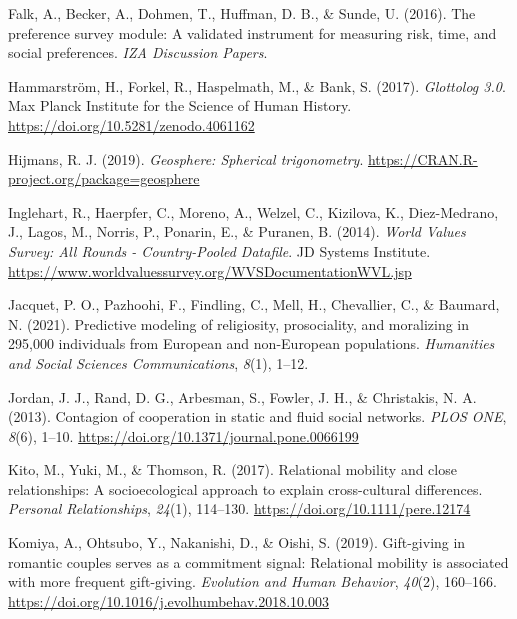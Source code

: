 \documentclass[
  man,floatsintext]{apa6}
\newlength{\cslhangindent}
\newlength{\cslentryspacingunit} %
\newenvironment{CSLReferences}[2] %
 {%
  \setlength{\parindent}{0pt}
  \ifodd #1
  \let\oldpar\par
  \def\par{\hangindent=\cslhangindent\oldpar}
  \fi
  \setlength{\parskip}{#2\cslentryspacingunit}
 }%
 {}
\begin{document}
\begin{CSLReferences}{1}{0}
\leavevmode{}%
Falk, A., Becker, A., Dohmen, T., Huffman, D. B., \& Sunde, U. (2016). The preference survey module: A validated instrument for measuring risk, time, and social preferences. \emph{IZA Discussion Papers}.

\leavevmode{}%
Hammarström, H., Forkel, R., Haspelmath, M., \& Bank, S. (2017). \emph{Glottolog 3.0}. Max Planck Institute for the Science of Human History. \url{https://doi.org/10.5281/zenodo.4061162}

\leavevmode{}%
Hijmans, R. J. (2019). \emph{Geosphere: Spherical trigonometry}. \url{https://CRAN.R-project.org/package=geosphere}

\leavevmode{}%
Inglehart, R., Haerpfer, C., Moreno, A., Welzel, C., Kizilova, K., Diez-Medrano, J., Lagos, M., Norris, P., Ponarin, E., \& Puranen, B. (2014). \emph{{World Values Survey: All Rounds - Country-Pooled Datafile}}. JD Systems Institute. \url{https://www.worldvaluessurvey.org/WVSDocumentationWVL.jsp}

\leavevmode{}%
Jacquet, P. O., Pazhoohi, F., Findling, C., Mell, H., Chevallier, C., \& Baumard, N. (2021). Predictive modeling of religiosity, prosociality, and moralizing in 295,000 individuals from {European} and {non-European} populations. \emph{Humanities and Social Sciences Communications}, \emph{8}(1), 1--12.

\leavevmode{}%
Jordan, J. J., Rand, D. G., Arbesman, S., Fowler, J. H., \& Christakis, N. A. (2013). Contagion of cooperation in static and fluid social networks. \emph{PLOS ONE}, \emph{8}(6), 1--10. \url{https://doi.org/10.1371/journal.pone.0066199}

\leavevmode{}%
Kito, M., Yuki, M., \& Thomson, R. (2017). Relational mobility and close relationships: A socioecological approach to explain cross-cultural differences. \emph{Personal Relationships}, \emph{24}(1), 114--130. \url{https://doi.org/10.1111/pere.12174}

\leavevmode{}%
Komiya, A., Ohtsubo, Y., Nakanishi, D., \& Oishi, S. (2019). Gift-giving in romantic couples serves as a commitment signal: Relational mobility is associated with more frequent gift-giving. \emph{Evolution and Human Behavior}, \emph{40}(2), 160--166. \url{https://doi.org/10.1016/j.evolhumbehav.2018.10.003}


\end{CSLReferences}
\end{document}
